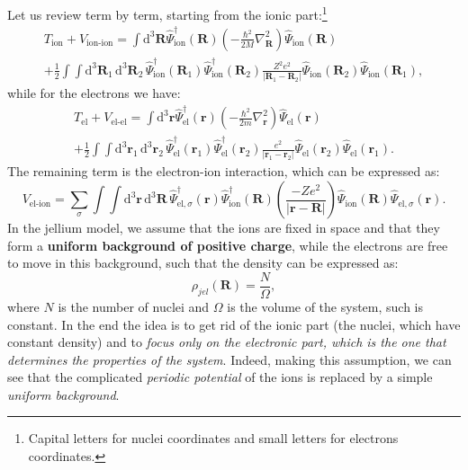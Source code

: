 Let us review term by term, starting from the ionic part:\footnote{Capital letters for nuclei coordinates and small letters for electrons coordinates.}
\[
    \begin{aligned}
        T_{\text{ion}} + V_{\text{ion-ion}} = \int \mathrm{d}^3 \mathbf{R} \hat{\Psi}_{\text{ion}}^\dagger(\mathbf{R}) \left( -\frac{\hbar^2}{2M} \nabla^2_{\mathbf{R}} \right) \hat{\Psi}_{\text{ion}}(\mathbf{R}) \\
        + \frac{1}{2} \int \int \mathrm{d}^3 \mathbf{R}_1 \, \mathrm{d}^3 \mathbf{R}_2 \, \hat{\Psi}_{\text{ion}}^\dagger(\mathbf{R}_1) \hat{\Psi}_{\text{ion}}^\dagger(\mathbf{R}_2) \frac{Z^2 e^2}{|\mathbf{R}_1 - \mathbf{R}_2|} \hat{\Psi}_{\text{ion}}(\mathbf{R}_2) \hat{\Psi}_{\text{ion}}(\mathbf{R}_1),
    \end{aligned}
\]
while for the electrons we have:
\[
    \begin{aligned}
        T_{\text{el}} + V_{\text{el-el}} = \int \mathrm{d}^3 \mathbf{r} \hat{\Psi}_{\text{el}}^\dagger(\mathbf{r}) \left( -\frac{\hbar^2}{2m} \nabla^2_{\mathbf{r}} \right) \hat{\Psi}_{\text{el}}(\mathbf{r}) \\
        + \frac{1}{2} \int \int \mathrm{d}^3 \mathbf{r}_1 \, \mathrm{d}^3 \mathbf{r}_2 \, \hat{\Psi}_{\text{el}}^\dagger(\mathbf{r}_1) \hat{\Psi}_{\text{el}}^\dagger(\mathbf{r}_2) \frac{e^2}{|\mathbf{r}_1 - \mathbf{r}_2|} \hat{\Psi}_{\text{el}}(\mathbf{r}_2) \hat{\Psi}_{\text{el}}(\mathbf{r}_1).
    \end{aligned}
\]
The remaining term is the electron-ion interaction, which can be expressed as:
\[
    V_{\text{el-ion}} = \sum_{\sigma} \int \int \mathrm{d}^3 \mathbf{r} \, \mathrm{d}^3 \mathbf{R} \, \hat{\Psi}_{\text{el}, \sigma}^\dagger(\mathbf{r}) \hat{\Psi}_{\text{ion}}^\dagger(\mathbf{R}) \left(\frac{- Z e^2}{|\mathbf{r} - \mathbf{R}|} \right) \hat{\Psi}_{\text{ion}}(\mathbf{R}) \hat{\Psi}_{\text{el} , \sigma}(\mathbf{r}).
\]
In the jellium model, we assume that the ions are fixed in space and that they form a \textbf{uniform background of positive charge}, while the electrons are free to move in this background, such that the density can be expressed as:
\[
    \rho_{jel} (\mathbf{R}) = \frac{N}{\Omega},
\]
where \(N\) is the number of nuclei and \(\Omega\) is the volume of the system, such is constant. In the end the idea is to get rid of the ionic part (the nuclei, which have constant density) and to \textit{focus only on the electronic part, which is the one that determines the properties of the system}. Indeed, making this assumption, we can see that the complicated \textit{periodic potential} of the ions is replaced by a simple \textit{uniform background}.

